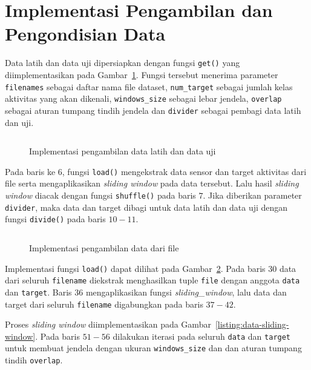 \section{Implementasi Pengambilan dan Pengondisian Data}
Data latih dan data uji dipersiapkan dengan fungsi \texttt{get()} yang diimplementasikan pada Gambar~\ref{listing:data-pengambilan-data-latih-uji}. Fungsi tersebut menerima parameter \texttt{filenames} sebagai daftar nama file dataset, \texttt{num_target} sebagai jumlah kelas aktivitas yang akan dikenali, \texttt{windows_size} sebagai lebar jendela, \texttt{overlap} sebagai aturan tumpang tindih jendela dan \texttt{divider} sebagai pembagi data latih dan uji.

\begin{figure}[h]
    \inputminted[firstline=5,firstnumber=5,lastline=22]{python}{../har/data.py}
    \caption{Implementasi pengambilan data latih dan data uji}
    \label{listing:data-pengambilan-data-latih-uji}
\end{figure}

Pada baris ke $6$, fungsi \texttt{load()} mengekstrak data sensor dan target aktivitas dari file serta mengaplikasikan \textit{sliding window} pada data tersebut. Lalu hasil \textit{sliding window} diacak dengan fungsi \texttt{shuffle()} pada baris $7$. Jika diberikan parameter \texttt{divider}, maka data dan target dibagi untuk data latih dan data uji dengan fungsi \texttt{divide()} pada baris $10 - 11$.

\begin{figure}[h]
    \inputminted[firstline=25,firstnumber=25,lastline=44]{python}{../har/data.py}
    \caption{Implementasi pengambilan data dari file}
    \label{listing:data-pengambilan-data-file}
\end{figure}

Implementasi fungsi \texttt{load()} dapat dilihat pada Gambar~\ref{listing:data-pengambilan-data-file}. Pada baris $30$ data dari seluruh \texttt{filename} diekstrak menghasilkan tuple \texttt{file} dengan anggota \texttt{data} dan \texttt{target}. Baris $36$ mengaplikasikan fungsi \textit{sliding\_window}, lalu data dan target dari seluruh \texttt{filename} digabungkan pada baris $37-42$.

Proses \textit{sliding window} diimplementasikan pada Gambar~\ref{listing:data-sliding-window}. Pada baris $51-56$ dilakukan iterasi pada seluruh \texttt{data} dan \texttt{target} untuk membuat jendela dengan ukuran \texttt{windows_size} dan dan aturan tumpang tindih \texttt{overlap}.

